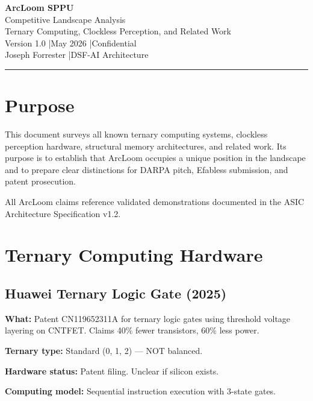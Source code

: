 \documentclass[11pt, a4paper]{article}
\begin{document}
\begin{center}
  {\LARGE \textbf{ArcLoom SPPU}}\\[6pt]
  {\large Competitive Landscape Analysis}\\[4pt]
  {\large Ternary Computing, Clockless Perception, and Related Work}\\[8pt]
  {\color{tfe-gray}\small Version 1.0 \quad|\quad May 2026 \quad|\quad Confidential}\\[4pt]
  {\color{tfe-gray}\small Joseph Forrester \quad|\quad DSF-AI Architecture}
\end{center}

\vspace{1em}
\hrule
\vspace{1em}

\section{Purpose}

This document surveys all known ternary computing systems, clockless
perception hardware, structural memory architectures, and related work.
Its purpose is to establish that ArcLoom occupies a unique position in
the landscape and to prepare clear distinctions for DARPA pitch,
Efabless submission, and patent prosecution.

All ArcLoom claims reference validated demonstrations documented in
the ASIC Architecture Specification v1.2.

\section{Ternary Computing Hardware}

\subsection{Huawei Ternary Logic Gate (2025)}

\textbf{What:} Patent CN119652311A for ternary logic gates using
threshold voltage layering on CNTFET. Claims 40\% fewer transistors,
60\% less power.

\textbf{Ternary type:} Standard (0, 1, 2) --- NOT balanced.

\textbf{Hardware status:} Patent filing. Unclear if silicon exists.

\textbf{Computing model:} Sequential instruction execution with
3-state gates.
\end{document}
